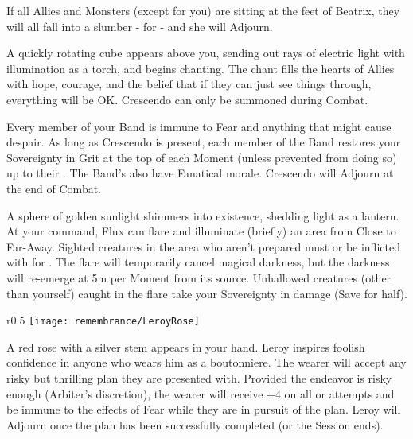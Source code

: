 If all Allies and Monsters (except for you) are sitting at the feet of Beatrix, they will all fall into a slumber -  for  - and she will Adjourn.



A quickly rotating cube appears above you, sending out rays of electric light with illumination as a torch, and begins chanting.  The chant fills the hearts of Allies with hope, courage, and the belief that if they can just see things through, everything will be OK. Crescendo can only be summoned during Combat. 

Every member of your Band is immune to Fear and anything that might cause despair. As long as Crescendo is present, each member of the Band restores your Sovereignty in Grit at the top of each Moment (unless prevented from doing so) up to their \MAX. The Band's  also have Fanatical morale. Crescendo will Adjourn at the end of Combat.


A sphere of golden sunlight shimmers into existence, shedding light as a lantern. At your command, Flux can flare and illuminate (briefly) an area from Close to Far-Away.  Sighted creatures in the area who aren't prepared must  or be inflicted with  for .  The flare will temporarily cancel magical darkness, but the darkness  will re-emerge at 5m per Moment from its source.  Unhallowed creatures (other than yourself) caught in the flare take your Sovereignty in damage (Save for half). 


\begin{wrapfigure}[20]{r}{0.5\textwidth}
    \texttt{[image: remembrance/LeroyRose]}
\end{wrapfigure}

A red rose with a silver stem appears in your hand.  Leroy inspires foolish confidence in anyone who wears him as a boutonniere.  The wearer will accept any risky but thrilling plan they are presented with. Provided the endeavor is risky enough (Arbiter's discretion), the wearer will receive +4 on all \RO or \RB attempts and be immune to the effects of Fear while they are in pursuit of the plan. Leroy will Adjourn once the plan has been successfully completed (or the Session ends).

